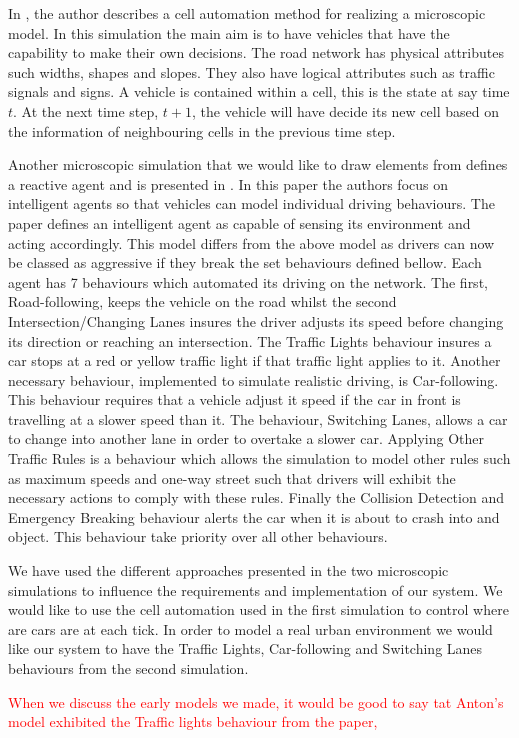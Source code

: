 \documentclass[]{article}
\begin{document}
In \cite{namekawa2005general}, the author describes a cell automation method for realizing a microscopic model. In this simulation the main aim is to have vehicles that have the capability to make their own decisions. The road network has physical attributes such widths, shapes and slopes. They also have logical attributes such as traffic signals and signs. A vehicle is contained within a cell, this is the state at say time $t$. At the next time step, $t+1$, the vehicle will have decide its new cell based on the information of neighbouring cells in the previous time step. 

Another microscopic simulation that we would like to draw elements from defines a reactive agent and is presented in \cite{ehlert2001microscopic}. In this paper the authors focus on intelligent agents so that vehicles can model individual driving behaviours. The paper defines an intelligent agent as capable of sensing its environment and acting accordingly. This model differs from the above model as drivers can now be classed as aggressive if they break the set behaviours defined bellow. Each agent has 7 behaviours which automated its driving on the network. The first, Road-following, keeps the vehicle on the road whilst the second Intersection/Changing Lanes insures the driver adjusts its speed before changing its direction or reaching an intersection. The Traffic Lights behaviour insures a car stops at a red or yellow traffic light if that traffic light applies to it.  Another necessary behaviour, implemented to simulate realistic driving, is Car-following. This behaviour requires that a vehicle adjust it speed if the car in front is travelling at a slower speed than it. The behaviour, Switching Lanes, allows a car to change into another lane in order to overtake a slower car. Applying Other Traffic Rules is a behaviour which allows the simulation to model other rules such as maximum speeds and one-way street such that drivers will exhibit the necessary actions to comply with these rules. Finally the Collision Detection and Emergency Breaking behaviour alerts the car when it is about to crash into and object. This behaviour take priority over all other behaviours. 

We have used the different approaches presented in the two microscopic simulations to influence the requirements and implementation of our system. We would like to use the cell automation used in the first simulation to control where are cars are at each tick. In order to model a real urban environment we would like our system to have the Traffic Lights, Car-following and Switching Lanes behaviours from the second simulation.

\textcolor{red}{When we discuss the early models we made, it would be good to say tat Anton's model exhibited the Traffic lights behaviour from the paper, \cite{ehlert2001microscopic}}




\end{document}
